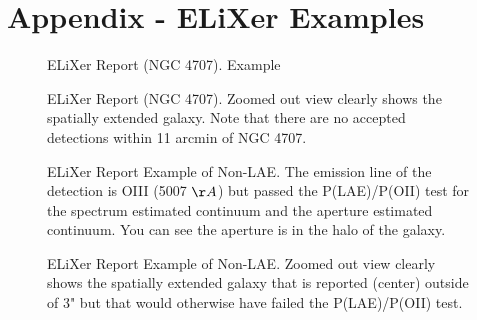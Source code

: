 \documentclass{aastex62}
\begin{document}
\newpage
\section{Appendix - ELiXer Examples}

\begin{figure}[H]
\caption{ELiXer Report (NGC 4707). Example \label{fig:elixer_ngc_4707}}
\end{figure}

\begin{figure}[H]
\caption{ELiXer Report (NGC 4707). Zoomed out view clearly shows the spatially extended galaxy. Note that there are no accepted detections within 11 arcmin of NGC 4707.\label{fig:elixer_ngc_4707_wide}}
\end{figure}


\begin{figure}[H]
\caption{ELiXer Report Example of Non-LAE. The emission line of the detection is OIII (5007 $\AA$) but passed the P(LAE)/P(OII) test for the spectrum estimated continuum and the aperture estimated continuum. You can see the aperture is in the halo of the galaxy. \label{fig:elixer_not_lae}}
\end{figure}

\begin{figure}[H]
\caption{ELiXer Report Example of Non-LAE. Zoomed out view clearly shows the spatially extended galaxy that is reported (center) outside of 3" but that would otherwise have failed the P(LAE)/P(OII) test.\label{fig:elixer_not_lae_wide}}
\end{figure}
\end{document}
